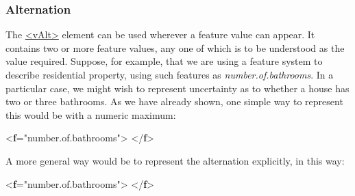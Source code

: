 \subsubsection[{Alternation}]{Alternation}\label{FVALT}\par
The \hyperref[TEI.vAlt]{<vAlt>} element can be used wherever a feature value can appear. It contains two or more feature values, any one of which is to be understood as the value required. Suppose, for example, that we are using a feature system to describe residential property, using such features as \textit{number.of.bathrooms}. In a particular case, we might wish to represent uncertainty as to whether a house has two or three bathrooms. As we have already shown, one simple way to represent this would be with a numeric maximum: \par\bgroup{}\exampleFont \begin{shaded}\noindent\mbox{}{<\textbf{f}\hspace*{1em}{name}="{number.of.bathrooms}">}\mbox{}\newline 
{}\mbox{}\newline 
{</\textbf{f}>}\end{shaded}\egroup\par \par
A more general way would be to represent the alternation explicitly, in this way: \par\bgroup{}\exampleFont \begin{shaded}\noindent\mbox{}{<\textbf{f}\hspace*{1em}{name}="{number.of.bathrooms}">}\mbox{}\newline 
{}\mbox{}\newline 
\hspace*{1em}\mbox{}\newline 
\hspace*{1em}\mbox{}\newline 
{}\mbox{}\newline 
{</\textbf{f}>}\end{shaded}\egroup\par \par
